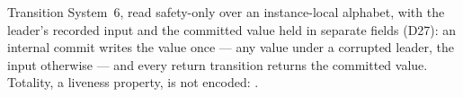 \begin{definition}
  \label{def:aba-brb-spec}
  \leanok
  Transition System~6, read safety-only over an instance-local alphabet, with the leader's recorded input and the committed value held in separate fields (D27): an internal commit writes the value once --- any value under a corrupted leader, the input otherwise --- and every return transition returns the committed value.
  Totality, a liveness property, is not encoded: .
\end{definition}
